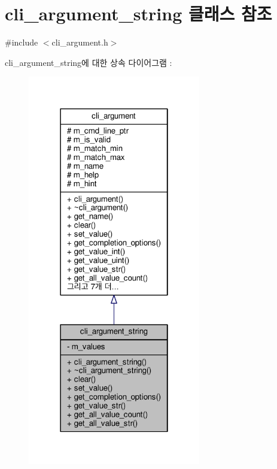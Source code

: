 \hypertarget{classcli__argument__string}{}\section{cli\+\_\+argument\+\_\+string 클래스 참조}
\label{classcli__argument__string}


{\ttfamily \#include $<$cli\+\_\+argument.\+h$>$}



cli\+\_\+argument\+\_\+string에 대한 상속 다이어그램 \+: 
\nopagebreak
\begin{figure}[H]
\begin{center}
\leavevmode
\includegraphics[width=214pt]{classcli__argument__string__inherit__graph}
\end{center}
\end{figure}


